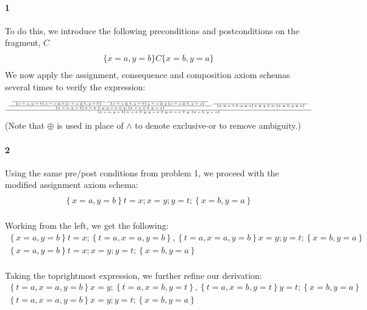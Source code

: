 \documentclass{article}
\begin{document}
\newcommand{\hpl}[3]{ \left \{ #1 \right \} #2 \left \{ #3 \right \} }
\newcommand{\derive}[2]{\begin{array}{c} #1 \\ \hline #2 \\ \end{array} }
\renewcommand{\and}{,}

\paragraph{1}
To do this, we introduce the following preconditions and postconditions on the fragment, $C$
\[ \derive{}{\{ x = a \and y = b \} C \{ x = b \and y = a \}} \]
We now apply the assignment, consequence and composition axiom schemas several times to verify the expression:
\begin{equation*}
\begin{tiny}
\derive{
 \derive{
 	\derive{}{
 	  \hpl{x = a \and y = b}{x = x \oplus b}{x = a \oplus b \and y = b}} \and
 	\derive{}{
 	  \hpl{x = a \oplus b \and y = b}{y = x \oplus y}{x = a \oplus b \and y = a}}
 	}{
	\hpl{x = a \and y = b}{x = x \oplus y; y = x \oplus y ;}{x = a \oplus b \and y = a}} \and
 \derive{}{
 	\hpl{x = a \oplus b \and y = a}{x = y \oplus x ;}{x = b  \and y = a }}}{ 
 \hpl{x = a \and y = b}{x = x \oplus y; y = x \oplus y ; x = x \oplus y ;}{x = b \and y = a} }
\end{tiny}
\end{equation*}
(Note that $\oplus$ is used in place of $\wedge$ to denote exclusive-or to remove ambiguity.)

\paragraph{2}
Using the same pre/post conditions from problem 1, we proceed with the modified assignment axiom schema:
\begin{equation*}
\derive{}
{ \hpl{x = a \and y = b}{t = x; x = y; y = t;}{x = b \and y = a} }
\end{equation*}

Working from the left, we get the following:
\begin{equation*}
\derive{ \hpl{x = a \and y = b}{ t = x; }{ t = a \and x = a \and y = b } \and
\hpl{t = a \and x = a \and y = b}{ x = y ; y = t ; }{ x = b \and  y = a }
}
{ \hpl{x = a \and y = b}{t = x; x = y; y = t;}{x = b \and y = a} }
\end{equation*}

Taking the toprightmost expression, we further refine our derivation:
\begin{equation*}
\derive{
\hpl{t=a \and x=a \and y=b}{x = y;}{t = a \and x = b \and y = t} \and
\hpl{t = a \and x = b \and y = t}{y = t; }{x = b \and y = a}
}
{\hpl{t = a \and x = a \and y = b}{ x = y ; y = t ; }{ x = b \and  y = a }}
\end{equation*}
\end{document}
